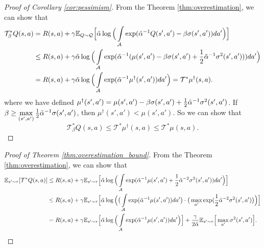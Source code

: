 \documentclass[10pt]{article} %
\begin{document}
\begin{appendices}
\begin{proof}[Proof of Corollary \ref{cor:pessimism}]
	From the Theorem \ref{thm:overestimation}, we can show that 
	\begin{align*}
		\mathcal{T}_{\beta}^{*} Q(s,a) 
		&= R(s,a) + \gamma \mathbb{E}_{Q\sim \mathcal{Q}} \Big[ \Tilde{\alpha} \log \Big( \int\limits_{\mathcal{A}} \exp({\Tilde{\alpha}}^{-1} Q(s',a') - \beta\sigma(s',a')) da' \Big) \Big] \\
		&\leq R(s,a) + \gamma \Tilde{\alpha} \log \Big( \int\limits_{\mathcal{A}} \exp( {\Tilde{\alpha}}^{-1} (\mu(s',a') - \beta \sigma(s',a') + \frac{1}{2} {\Tilde{\alpha}}^{-1} \sigma^2(s',a')) ) da' \Big) \\
		&=  R(s,a) + \gamma \Tilde{\alpha} \log \Big( \int\limits_{\mathcal{A}} \exp( {\Tilde{\alpha}}^{-1} \mu^{\dagger}(s',a')) da' \Big) = \mathcal{T}^{*} \mu^{\dagger}(s,a). 
	\end{align*}
	where we have defined $\mu^{\dagger}(s',a') = \mu(s',a') - \beta \sigma(s',a') + \frac{1}{2} {\Tilde{\alpha}}^{-1} \sigma^2(s',a') $. If $\beta \geq \max\limits_{(s', a')} \frac{1}{2}{\Tilde{\alpha}}^{-1} \sigma(s', a')$, then $\mu^{\dagger}(s',a') < \mu(s',a')$. So we can show that
	\begin{equation}
		\mathcal{T}_{\beta}^{*} Q(s,a) \leq \mathcal{T}^{*} \mu^{\dagger}(s,a) \leq \mathcal{T}^{*} \mu(s,a).  
	\end{equation}
\end{proof}

\begin{proof}[Proof of Theorem \ref{thm:overestimation_bound}]
	From the Theorem \ref{thm:overestimation}, we can show that
	\begin{align*}
		\mathbb{E}_{s'\sim\tau} [ \mathcal{T}^{*} Q(s,a) ] &\leq R(s,a) + \gamma \mathbb{E}_{s'\sim\tau } \Big[ \Tilde{\alpha} \log \Big( \int\limits_{\mathcal{A}} \exp( {\Tilde{\alpha}}^{-1} \mu(s',a') + \frac{1}{2} {\Tilde{\alpha}}^{-2} \sigma^2(s',a') ) da' \Big) \Big] \\
		&\leq R(s,a) + \gamma \mathbb{E}_{s'\sim\tau } \Big[ \Tilde{\alpha} \log \Big( \big( \int\limits_{\mathcal{A}} \exp( {\Tilde{\alpha}}^{-1} \mu(s',a') ) da' \big) \cdot \big( \max_{a'} \exp( \frac{1}{2} {\Tilde{\alpha}}^{-2} \sigma^2(s',a') \big) \Big) \Big] \\  
		&= R(s,a) + \gamma \mathbb{E}_{s'\sim\tau } \Big[ \Tilde{\alpha} \log \Big( \int\limits_{\mathcal{A}} \exp( {\Tilde{\alpha}}^{-1} \mu(s',a') ) da' \Big) \Big] + \frac{\gamma}{2\Tilde{\alpha}} \mathbb{E}_{s'\sim\tau } \Big[ \max_{a'} \sigma^2(s',a') \Big]. \\ 
	\end{align*}
	

\end{proof}
\end{appendices}
\end{document}
